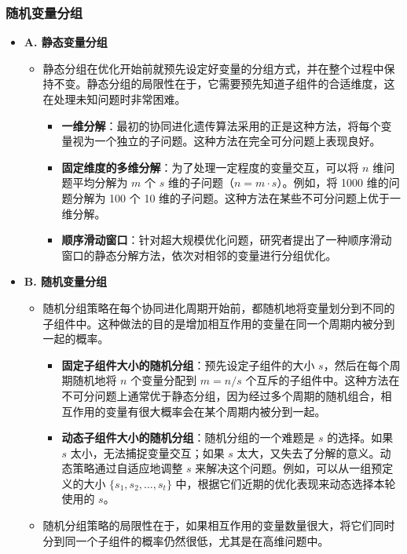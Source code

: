 \subsubsection{随机变量分组}


\begin{itemize}
    \item \textbf{A. 静态变量分组}
    \begin{itemize}
        \item 静态分组在优化开始前就预先设定好变量的分组方式，并在整个过程中保持不变。静态分组的局限性在于，它需要预先知道子组件的合适维度，这在处理未知问题时非常困难。
        \begin{itemize}
            \item \textbf{一维分解}：最初的协同进化遗传算法采用的正是这种方法，将每个变量视为一个独立的子问题。这种方法在完全可分问题上表现良好。
            \item \textbf{固定维度的多维分解}：为了处理一定程度的变量交互，可以将 $n$ 维问题平均分解为 $m$ 个 $s$ 维的子问题（$n = m \cdot s$）。例如，将 1000 维的问题分解为 100 个 10 维的子问题。这种方法在某些不可分问题上优于一维分解。
            \item \textbf{顺序滑动窗口}：针对超大规模优化问题，研究者提出了一种顺序滑动窗口的静态分解方法，依次对相邻的变量进行分组优化。
        \end{itemize}
    \end{itemize}

    \item \textbf{B. 随机变量分组}
    \begin{itemize}
        \item 随机分组策略在每个协同进化周期开始前，都随机地将变量划分到不同的子组件中。这种做法的目的是增加相互作用的变量在同一个周期内被分到一起的概率。
        \begin{itemize}
            \item \textbf{固定子组件大小的随机分组}：预先设定子组件的大小 $s$，然后在每个周期随机地将 $n$ 个变量分配到 $m = n / s$ 个互斥的子组件中。这种方法在不可分问题上通常优于静态分组，因为经过多个周期的随机组合，相互作用的变量有很大概率会在某个周期内被分到一起。
            \item \textbf{动态子组件大小的随机分组}：随机分组的一个难题是 $s$ 的选择。如果 $s$ 太小，无法捕捉变量交互；如果 $s$ 太大，又失去了分解的意义。动态策略通过自适应地调整 $s$ 来解决这个问题。例如，可以从一组预定义的大小 $\{s_1, s_2, \dots, s_t\}$ 中，根据它们近期的优化表现来动态选择本轮使用的 $s$。
        \end{itemize}
        \item 随机分组策略的局限性在于，如果相互作用的变量数量很大，将它们同时分到同一个子组件的概率仍然很低，尤其是在高维问题中。
    \end{itemize}


\end{itemize}
